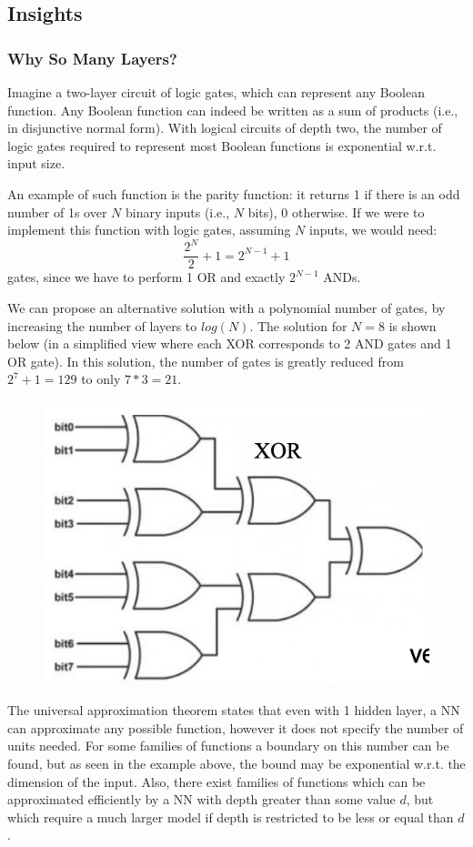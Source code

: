\subsection{Insights}

\subsubsection{Why So Many Layers?}

Imagine a two-layer circuit of logic gates, which can represent any Boolean function. Any Boolean function can indeed be written as a sum of products (i.e., in disjunctive normal form). With logical circuits of depth two, the number of logic gates required to represent most Boolean functions is exponential w.r.t. input size.

An example of such function is the parity function: it returns 1 if there is an odd number of 1s over $N$ binary inputs (i.e., $N$ bits), 0 otherwise. If we were to implement this function with logic gates, assuming $N$ inputs, we would need:
\begin{equation*}
    \dfrac{2^N}{2} + 1 = 2^{N-1} + 1
\end{equation*}
gates, since we have to perform 1 OR and exactly $2^{N-1}$ ANDs.

We can propose an alternative solution with a polynomial number of gates, by increasing the number of layers to $log(N)$. The solution for $N=8$ is shown below (in a simplified view where each XOR corresponds to 2 AND gates and 1 OR gate). In this solution, the number of gates is greatly reduced from $2^7 + 1 = 129$ to only $7 * 3 = 21$.
\begin{figure}[h]
    \centering
    \includegraphics[width=0.5\linewidth]{img/Circuit_deep.png}
\end{figure}

The universal approximation theorem states that even with 1 hidden layer, a NN can approximate any possible function, however it does not specify the number of units needed. For some families of functions a boundary on this number can be found, but as seen in the example above, the bound may be exponential w.r.t. the dimension of the input. Also, there exist families of functions which can be approximated efficiently by a NN with depth greater than some value $d$, but which require a much larger model if depth is restricted to be less or equal than $d$.

